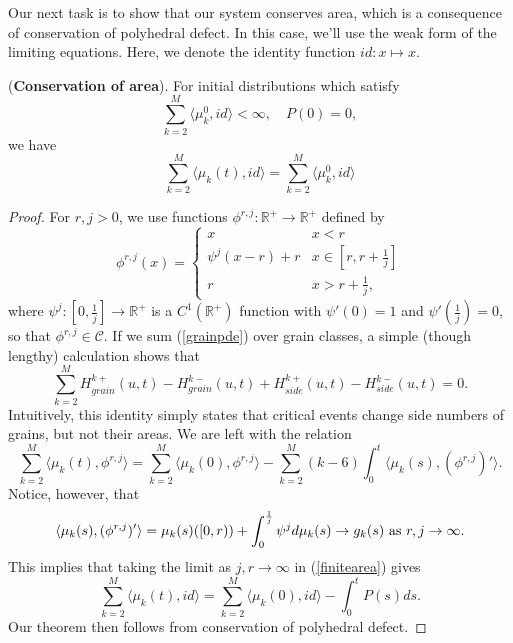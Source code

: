Our next task is to show that our system conserves area, which is a consequence of conservation of polyhedral defect.  In this case, we'll  use the weak form of the limiting equations.  Here, we denote the identity function $id: x \mapsto x$.     
\begin{theorem}(\textbf{Conservation of area}).  For initial distributions which satisfy
\begin{equation}
\sum_{k = 2}^M\langle \mu_k^0,id\rangle< \infty, \quad P(0) = 0, 
\end{equation} 
we have 
\begin{equation}
\sum_{k = 2}^M\langle \mu_k(t),id\rangle = \sum_{k = 2}^M\langle \mu_k^0,id\rangle
\end{equation}
\end{theorem}
\begin{proof}  For $r,j>0$, we use functions $\phi^{r,j}:\mathbb{R}^+ \rightarrow \mathbb{R}^+$ defined by
\begin{equation}
\phi^{r,j}(x) = \begin{cases}x & x<r \\
\psi^{j}(x-r)+r & x \in [r,r+\frac 1j] \\
r  \ & x > r+\frac 1j,
\end{cases}
\end{equation}
where $\psi^j:[0,\frac 1j]\rightarrow \mathbb{R}^+$ is a $C^1(\mathbb{R}^+)$ function with $\psi'(0) = 1$ and $\psi'(\frac1j) = 0$, so that $\phi^{r,j}\in \mathcal C$.  If we sum (\ref{grainpde})  over grain classes, a simple  (though lengthy) calculation shows that
\begin{equation}
\sum_{k = 2}^MH^{k+}_{grain}(u,t)-H_{grain}^{k-}(u,t)+H^{k+}_{side}(u,t)-H_{side}^{k-}(u,t)= 0.
\end{equation}
Intuitively, this identity simply states that critical events change side numbers of grains, but not their areas.  We are left with the relation
\begin{equation}\label{finitearea}
\sum_{k = 2}^M\langle \mu_k(t), \phi^{r,j}\rangle =  \sum_{k = 2}^M\langle \mu_k(0), \phi^{r,j}\rangle-\sum_{k = 2}^M(k-6)\int_0^t \langle \mu_k(s), (\phi^{r,j})' \rangle.
\end{equation}
Notice, however, that 
\begin{equation}
\langle \mu_k(s), (\phi^{r,j})' \rangle= \mu_k(s)([0,r))+\int_0^{\frac 1j}\psi^j d\mu_k(s) \rightarrow g_k(s) \hbox{ as } r,j\rightarrow \infty.
\end{equation}  
This implies that taking the limit as $j,r\rightarrow \infty$ in (\ref{finitearea}) gives
\begin{equation}
 \sum_{k = 2}^M\langle \mu_k(t), id\rangle =  \sum_{k = 2}^M\langle \mu_k(0), id\rangle-\int_0^t P(s)ds.
\end{equation}
Our theorem then follows from conservation of polyhedral defect.
\end{proof}

